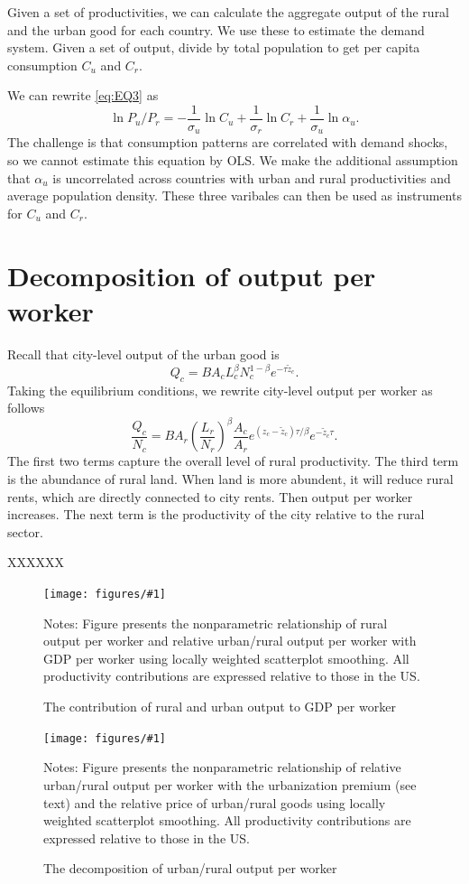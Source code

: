 \documentclass[12pt]{article}
\newcommand{\dofigure}[3]{\begin{figure}
\begin{centering}
\texttt{[image: figures/\#1]}
  \caption{#2\label{fig:#1}}
\end{centering}

\noindent \footnotesize{#3}
\end{figure}}
\begin{document}
Given a set of productivities, we can calculate the aggregate output of the rural and the urban good for each country. We use these to estimate the demand system. Given a set of output, divide by total population to get per capita consumption $C_u$ and $C_r$. 

We can rewrite \eqref{eq:EQ3} as 
\[
\ln P_u/P_r = -\frac 1 {\sigma_u}\ln C_u + \frac 1 {\sigma_r}\ln C_r + \frac 1 {\sigma_u}\ln\alpha_u.
\]
The challenge is that consumption patterns are correlated with demand shocks, so we cannot estimate this equation by OLS. We make the additional assumption that $\alpha_u$ is uncorrelated across countries with urban and rural productivities and average population density. These three varibales can then be used as instruments for $C_u$ and $C_r$.


\section{Decomposition of output per worker}
Recall that city-level output of the urban good is
\[
Q_c =
BA_cL_c^{\beta}N_c^{1-\beta}
 e^{-\tau\tilde z_c}.
\]
Taking the equilibrium conditions, we rewrite city-level output per worker as follows
\begin{equation}
\frac {Q_c}{N_c} =
B A_r 
\left(\frac 
	{L_r}{N_r}
\right)^\beta
\frac{A_c}{A_r}
e^{(z_c-\tilde z_c)\tau/\beta}
e^{-\tilde z_c\tau}.
\end{equation}
The first two terms capture the overall level of rural productivity. The third term is the abundance of rural land. When land is more abundent, it will reduce rural rents, which are directly connected to city rents. Then output per worker increases. The next term is the productivity of the city relative to the rural sector.

XXXXXX


\dofigure{../../research_designs/city_level_inputs/output/rural_urban_contributions}{The contribution of rural and urban output to GDP per worker}{Notes: Figure presents the nonparametric relationship of rural output per worker and relative urban/rural output per worker with GDP per worker using locally weighted scatterplot smoothing. All productivity contributions are expressed relative to those in the US.}

\dofigure{../../research_designs/city_level_inputs/output/urban_contributions}{The decomposition of urban/rural output per worker}{Notes: Figure presents the nonparametric relationship of relative urban/rural output per worker with the urbanization premium (see text) and the relative price of urban/rural goods  using locally weighted scatterplot smoothing. All productivity contributions are expressed relative to those in the US.}
\end{document}
